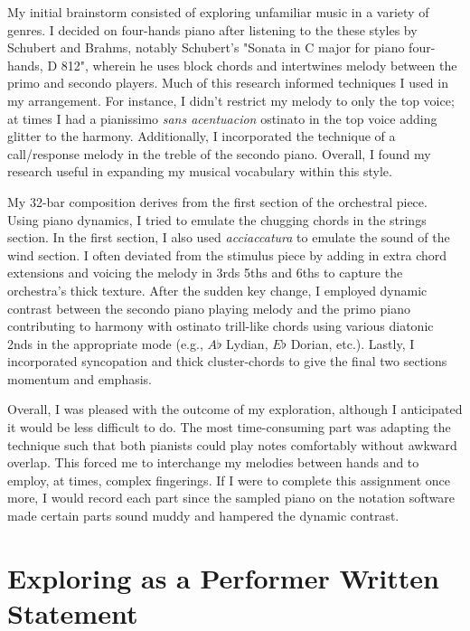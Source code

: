 \documentclass[12pt]{article}
\begin{document}
My initial brainstorm consisted of exploring unfamiliar music in a variety of genres. I decided on four-hands piano after listening to the these styles by Schubert and Brahms, notably Schubert’s "Sonata in C major for piano four-hands, D 812", wherein he uses block chords and intertwines melody between the primo and secondo players. Much of this research informed techniques I used in my arrangement. For instance, I didn't restrict my melody to only the top voice; at times I had a pianissimo \textit{sans acentuacion} ostinato in the top voice adding glitter to the harmony. Additionally, I incorporated the technique of a call/response melody in the treble of the secondo piano. Overall, I found my research useful in expanding my musical vocabulary within this style.

My 32-bar composition derives from the first section of the orchestral piece. Using piano dynamics, I tried to emulate the chugging chords in the strings section. In the first section, I also used \textit{acciaccatura} to emulate the sound of the wind section. I often deviated from the stimulus piece by adding in extra chord extensions and voicing the melody in 3rds 5ths and 6ths to capture the orchestra's thick texture. After the sudden key change, I employed dynamic contrast between the secondo piano playing melody and the primo piano contributing to harmony with ostinato trill-like chords using various diatonic 2nds in the appropriate mode (e.g., $A\flat$ Lydian, $E\flat$ Dorian, etc.). Lastly, I incorporated syncopation and thick cluster-chords to give the final two sections momentum and emphasis.

Overall, I was pleased with the outcome of my exploration, although I anticipated it would be less difficult to do. The most time-consuming part was adapting the technique such that both pianists could play notes comfortably without awkward overlap. This forced me to interchange my melodies between hands and to employ, at times, complex fingerings. If I were to complete this assignment once more, I would record each part since the sampled piano on the notation software made certain parts sound muddy and hampered the dynamic contrast.


\section{Exploring as a Performer Written Statement}
\end{document}
